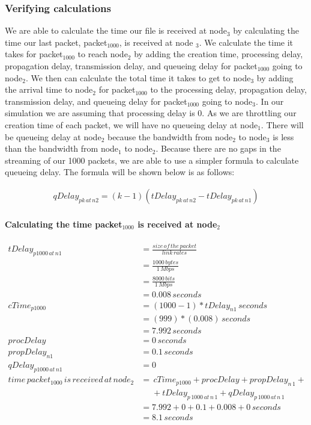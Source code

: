 \documentclass[fleqn,11pt]{article}
\begin{document}
\subsubsection{Verifying calculations}
We are able to calculate the time our file is received at node$_3$ by calculating the time our last packet, packet$_{1000}$, is received at node $_3$. We calculate the time it takes for packet$_{1000}$ to reach node$_2$ by adding the creation time, processing delay, propagation delay, transmission delay, and queueing delay for packet$_{1000}$ going to node$_2$. We then can calculate the total time it takes to get to node$_3$ by adding the arrival time to node$_2$ for packet$_{1000}$ to the processing delay, propagation delay, transmission delay, and queueing delay for packet$_{1000}$ going to node$_3$. In our simulation we are assuming that processing delay is 0. As we are throttling our creation time of each packet, we will have no queueing delay at node$_1$. There will be queueing delay at node$_2$ because the bandwidth from node$_2$ to node$_3$ is less than the bandwidth from node$_1$ to node$_2$. Because there are no gaps in the streaming of our 1000 packets, we are able to use a simpler formula to calculate queueing delay. The formula will be shown below is as follows:

\begin{align*}
qDelay_{pk\,at\,n2} = (k - 1) (tDelay_{pk\,at\,n2} - tDelay_{pk\,at\,n1})
\end{align*}

\paragraph{Calculating the time packet$_{1000}$ is received at node$_2$ }
\begin{align*}
tDelay_{p1000\,at\,n1} &=  \frac{size\,of\,the\,packet} {link\,rates}\\
&= \frac{1000\,bytes} {1\,Mbps}\\
&=  \frac{8000\,bits} {1\,Mbps}\\
&= 0.008 \,seconds\\
cTime_{p1000} &= (1000-1) *tDelay_{n1}\,seconds\\
&= (999) *(0.008)\,seconds\\
&= 7.992\,seconds\\
procDelay &= 0\,seconds\\
propDelay_{n1} &= 0.1\,seconds\\
qDelay_{p1000\,at\,n1} &= 0\\
time\,packet_{1000}\,is\,received\,at\,node_{2} &= \,cTime_{p1000} + procDelay + propDelay_{n\,1} +\\
&\,\,\,\,\,\,\,\, + tDelay_{p\,1000\,at\,n\,1} + qDelay_{p\,1000\,at\,n\,1}\\
&= 7.992 + 0 + 0.1 + 0.008 + 0\,seconds\\
&= 8.1\,seconds
\end{align*}
\end{document}
